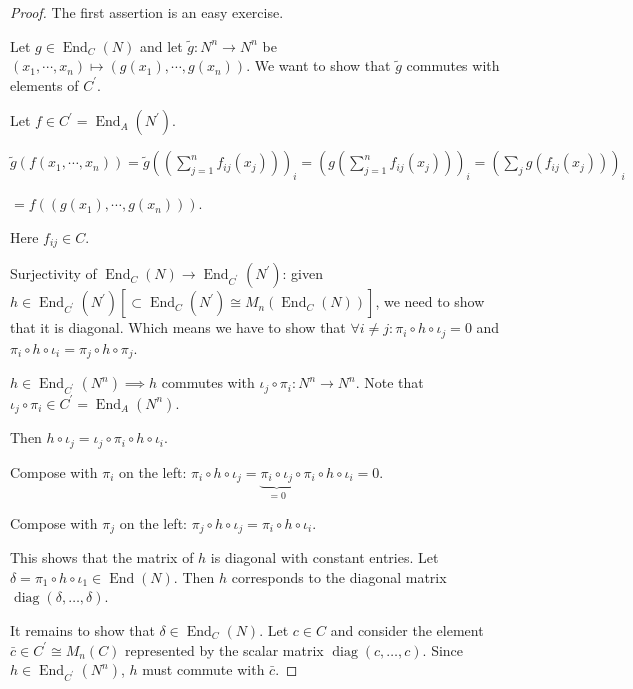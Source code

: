 \documentclass{article}
\theoremstyle{definition}
\theoremstyle{plain}
\theoremstyle{remark}
\begin{document}
    \begin{proof}
        The first assertion is an easy exercise.

        Let \(g\in \operatorname{End}_C(N)\) and let \(\widetilde{g}: N^n \to N^n\) be \((x_1 , \cdots , x_n) \mapsto (g(x_1), \cdots , g(x_n))\). We want to show that \(\widetilde{g}\) commutes with elements of \(C^{\prime}\).

        Let \(f\in C^{\prime} = \operatorname{End}_A (N^{\prime})\). 
        
        \(\widetilde{g} (f(x_1, \cdots , x_n)) = \widetilde{g} \left( \left( \sum_{j=1}^n f_{ij}(x_j) \right)\right)_i = \left( g \left( \sum_{j=1}^n f_{ij}(x_j) \right)  \right) _i = \left( \sum_{j} g(f_{ij}(x_j)) \right)_i\)
        
        \(= f \left( (g(x_1), \cdots , g(x_n)) \right)\).
        
        Here \(f_{ij} \in C\).
        
        Surjectivity of \(\operatorname{End}_C(N) \to \operatorname{End}_{C^{\prime}}(N^{\prime})\): given \(h\in \operatorname{End}_{C^{\prime}}(N^{\prime}) [\subset \operatorname{End}_C (N^{\prime}) \cong M_n(\operatorname{End}_C(N))]\), we need to show that it is diagonal. Which means we have to show that \(\forall i \neq j: \pi_i \circ h \circ \iota_j = 0\) and \(\pi_i \circ h \circ \iota_i = \pi_j \circ h \circ \pi_j\).

        \(h \in \operatorname{End}_{C^{\prime}}(N^n) \implies h\) commutes with \(\iota_j \circ \pi_i : N^n \to N^n\). Note that \(\iota_j \circ \pi_i \in C^{\prime} = \operatorname{End}_A(N^n)\).

        Then \(h \circ \iota_j = \iota_j \circ \pi_i \circ h \circ \iota_i\).
        
        Compose with \(\pi_i\) on the left: \(\pi_i \circ h \circ \iota_j = \underbrace{\pi_i \circ \iota_j}_{=0} \circ \pi_i \circ h \circ \iota_i = 0\). 

        Compose with \(\pi_j\) on the left: \(\pi_j \circ h \circ \iota_j = \pi_i \circ h \circ \iota_i\).

        This shows that the matrix of \(h\) is diagonal with constant entries. Let \(\delta = \pi_1 \circ h \circ \iota_1 \in \operatorname{End}(N)\). Then \(h\) corresponds to the diagonal matrix \(\operatorname{diag}(\delta, \dots, \delta)\).

        It remains to show that \(\delta \in \operatorname{End}_C(N)\). Let \(c \in C\) and consider the element \(\bar{c} \in C^{\prime} \cong M_n(C)\) represented by the scalar matrix \(\operatorname{diag}(c, \dots, c)\). Since \(h \in \operatorname{End}_{C^{\prime}}(N^n)\), \(h\) must commute with \(\bar{c}\).
    

\end{proof}
\end{document}
